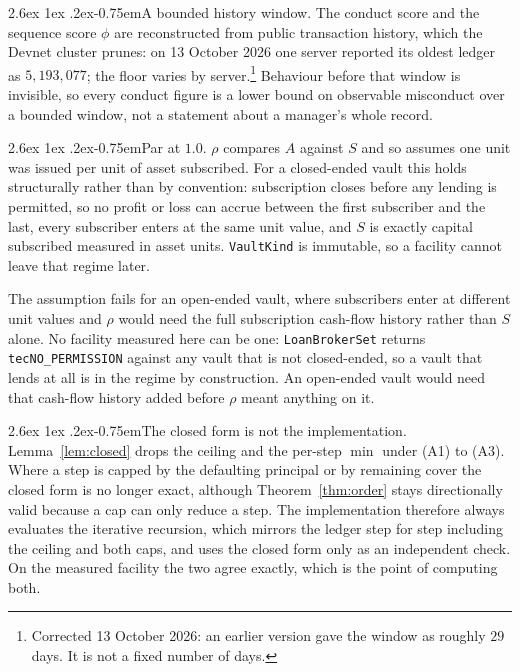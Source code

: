 \documentclass[11pt]{article}
\makeatletter
\renewcommand\paragraph{\@startsection{paragraph}{4}{\z@}%
  {2.6ex \@plus 1ex \@minus .2ex}{-0.75em}{\normalfont\normalsize\bfseries}}
\theoremstyle{orma}
\theoremstyle{ormaupright}
\makeatother
\begin{document}
\paragraph{A bounded history window.} The conduct score and the sequence score $\phi$ are
reconstructed from public transaction history, which the Devnet cluster prunes: on 13 October
2026 one server reported its oldest ledger as $5{,}193{,}077$; the floor varies by server.\footnote{Corrected 13 October 2026: an
earlier version gave the window as roughly $29$ days. It is not a fixed number of days.}
Behaviour before that window is invisible, so every conduct figure is a lower
bound on observable misconduct over a bounded window, not a statement about a manager's
whole record.

\paragraph{Par at $1.0$.} $\rho$ compares $A$ against $S$ and so assumes one unit was issued
per unit of asset subscribed. For a closed-ended vault this holds structurally rather than
by convention: subscription closes before any lending is permitted, so no profit or loss can
accrue between the first subscriber and the last, every subscriber enters at the same unit
value, and $S$ is exactly capital subscribed measured in asset units. \texttt{VaultKind} is
immutable, so a facility cannot leave that regime later.

The assumption fails for an
open-ended vault, where subscribers enter at different unit values and $\rho$ would need the
full subscription cash-flow history rather than $S$ alone. No facility measured here can be
one: \texttt{LoanBrokerSet} returns \texttt{tecNO\_PERMISSION} against any vault that is not
closed-ended, so a vault that lends at all is in the regime by construction. An open-ended
vault would need that cash-flow history added before $\rho$ meant anything on it.

\paragraph{The closed form is not the implementation.} Lemma~\ref{lem:closed} drops the
ceiling and the per-step $\min$ under (A1) to (A3). Where a step is capped by the defaulting
principal or by remaining cover the closed form is no longer exact, although
Theorem~\ref{thm:order} stays directionally valid because a cap can only reduce a step. The
implementation therefore always evaluates the iterative recursion, which mirrors the ledger
step for step including the ceiling and both caps, and uses the closed form only as an
independent check. On the measured facility the two agree exactly, which is the point of
computing both.
\end{document}
